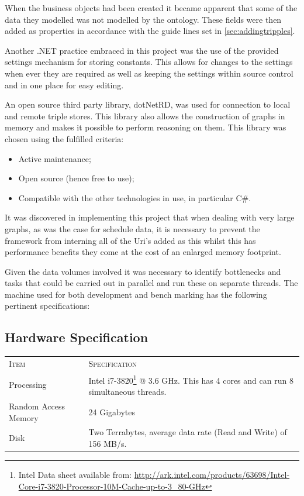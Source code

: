 When the business objects had been created it became apparent that some of the data they modelled was not modelled by the ontology. These fields were then added as properties in accordance with the guide lines set in \autoref{sec:addingtripples}.

Another .NET practice embraced in this project was the use of the provided settings mechanism for storing constants. This allows for changes to the settings when ever they are required as well as keeping the settings within source control and in one place for easy editing. 

An open source third party library, dotNetRD, was used for connection to local and remote triple stores. This library also allows the construction of graphs in memory and makes it possible to perform reasoning on them. This library was chosen using the fulfilled criteria:
\begin{itemize}
 \item Active maintenance;
 \item Open source (hence free to use);
 \item Compatible with the other technologies in use, in particular C\#.
\end{itemize}

It was discovered in implementing this project that when dealing with very large graphs, as was the case for schedule data, it is necessary to prevent the framework from interning all of the Uri's added as this whilst this has performance benefits they come at the cost of an enlarged memory footprint.

Given the data volumes involved it was necessary to identify bottlenecks and tasks that could be carried out in parallel and run these on separate threads. The machine used for both development and bench marking has the following pertinent specifications:
\subsection{Hardware Specification}

\noindent
\begin{tabularx}{\textwidth}{XX} 
\textsc{Item} & \textsc{Specification}\\ 
\arrayrulecolor{LightSteelBlue}\midrule[\heavyrulewidth]
Processing & Intel i7-3820\footnote{Intel Data sheet available from: \url{http://ark.intel.com/products/63698/Intel-Core-i7-3820-Processor-10M-Cache-up-to-3_80-GHz}} @ 3.6 GHz. This has 4 cores and can run 8 simultaneous threads. \\
Random Access Memory & 24 Gigabytes \\
Disk & Two Terrabytes, average data rate (Read and Write) of 156 MB/s. \\
\bottomrule
\end{tabularx}
 
